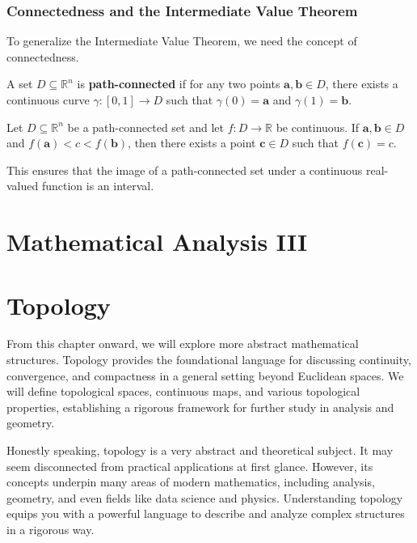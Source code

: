 \subsection{Connectedness and the Intermediate Value Theorem}

To generalize the Intermediate Value Theorem, we need the concept of connectedness.

\begin{definition}
A set $D \subseteq \mathbb{R}^n$ is \textbf{path-connected} if for any two points $\mathbf{a}, \mathbf{b} \in D$, there exists a continuous curve $\gamma: [0, 1] \to D$ such that $\gamma(0) = \mathbf{a}$ and $\gamma(1) = \mathbf{b}$.
\end{definition}

\begin{theorem}
Let $D \subseteq \mathbb{R}^n$ be a path-connected set and let $f: D \to \mathbb{R}$ be continuous. If $\mathbf{a}, \mathbf{b} \in D$ and $f(\mathbf{a}) < c < f(\mathbf{b})$, then there exists a point $\mathbf{c} \in D$ such that $f(\mathbf{c}) = c$.
\end{theorem}

This ensures that the image of a path-connected set under a continuous real-valued function is an interval.


\chapter{Mathematical Analysis III}

\chapter{Topology}

From this chapter onward, we will explore more abstract mathematical structures. Topology provides the foundational language for discussing continuity, convergence, and compactness in a general setting beyond Euclidean spaces. We will define topological spaces, continuous maps, and various topological properties, establishing a rigorous framework for further study in analysis and geometry.

Honestly speaking, topology is a very abstract and theoretical subject. It may seem disconnected from practical applications at first glance. However, its concepts underpin many areas of modern mathematics, including analysis, geometry, and even fields like data science and physics. Understanding topology equips you with a powerful language to describe and analyze complex structures in a rigorous way.

